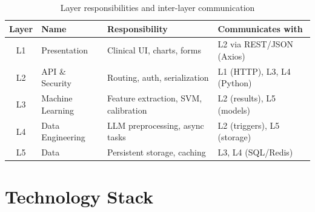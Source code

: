 \documentclass[12pt,a4paper,twoside]{report}
\begin{document}
\begin{table}[htbp]
\centering
\caption{Layer responsibilities and inter-layer communication}
\label{tab:layer_summary}
\small\setlength{\parskip}{0pt}
\begin{tabular}{clp{4cm}p{4cm}}
\toprule
\textbf{Layer} & \textbf{Name} & \textbf{Responsibility} & \textbf{Communicates with} \\
\midrule
L1 & Presentation & Clinical UI, charts, forms & L2 via REST/JSON (Axios) \\
L2 & API \& Security & Routing, auth, serialization & L1 (HTTP), L3, L4 (Python) \\
L3 & Machine Learning & Feature extraction, SVM, calibration & L2 (results), L5 (models) \\
L4 & Data Engineering & LLM preprocessing, async tasks & L2 (triggers), L5 (storage) \\
L5 & Data & Persistent storage, caching & L3, L4 (SQL/Redis) \\
\bottomrule
\end{tabular}
\end{table}

\section{Technology Stack}\label{sec:techstack}
\end{document}
